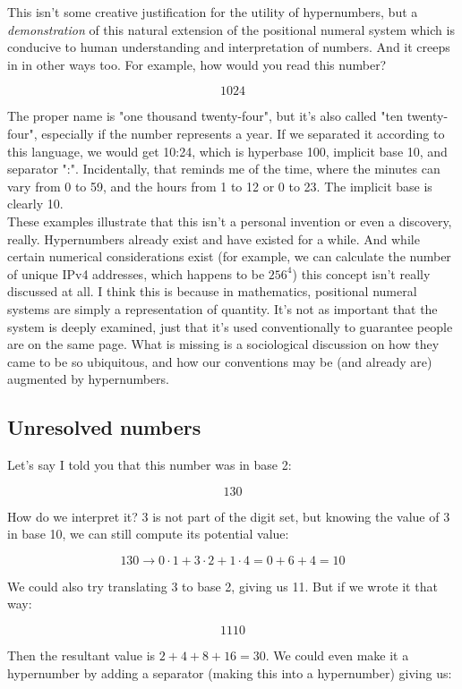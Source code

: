 \documentclass{article}
\begin{document}
\noindent This isn't some creative justification for the utility of hypernumbers, but a \textit{demonstration} of this natural extension of the positional numeral system which is conducive to human understanding and interpretation of numbers. And it creeps in in other ways too. For example, how would you read this number?

$$1024$$

\noindent The proper name is "one thousand twenty-four", but it's also called "ten twenty-four", especially if the number represents a year. If we separated it according to this language, we would get 10:24, which is hyperbase 100, implicit base 10, and separator ":". Incidentally, that reminds me of the time, where the minutes can vary from 0 to 59, and the hours from 1 to 12 or 0 to 23. The implicit base is clearly 10.\\

\noindent These examples illustrate that this isn't a personal invention or even a discovery, really. Hypernumbers already exist and have existed for a while. And while certain numerical considerations exist (for example, we can calculate the number of unique IPv4 addresses, which happens to be $256^4$) this concept isn't really discussed at all. I think this is because in mathematics, positional numeral systems are simply a representation of quantity. It's not as important that the system is deeply examined, just that it's used conventionally to guarantee people are on the same page. What is missing is a sociological discussion on how they came to be so ubiquitous, and how our conventions may be (and already are) augmented by hypernumbers.

\subsection*{Unresolved numbers}

Let's say I told you that this number was in base 2:

$$130$$

\noindent How do we interpret it? 3 is not part of the digit set, but knowing the value of 3 in base 10, we can still compute its potential value:

$$130 \rightarrow 0 \cdot 1 + 3 \cdot 2 + 1 \cdot 4 = 0 + 6 + 4 = 10$$

\noindent We could also try translating 3 to base 2, giving us 11. But if we wrote it that way:

$$1110$$

\noindent Then the resultant value is $2 + 4 + 8 + 16 = 30$. We could even make it a hypernumber by adding a separator (making this into a hypernumber) giving us:
\end{document}
